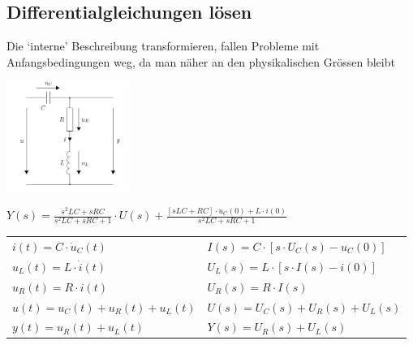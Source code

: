 \subsection{Differentialgleichungen lösen}
Die ‘interne’ Beschreibung transformieren, fallen Probleme mit Anfangsbedingungen weg, da man näher
an den physikalischen Grössen bleibt
\begin{multicols}{2}
		\begin{center}
			\includegraphics[width=4cm]{./images/diffgleichung.png}
		\end{center}
		$Y(s) = \frac{s^2 LC+sRC}{s^2 LC +sRC +1}\cdot U(s) + \frac{[sLC + RC] \cdot u_{C}(0) + L \cdot i(0)}{s^2 LC +sRC +1}$
	\columnbreak
\begin{center}
	\begin{tabular}{ll}
		$i(t) = C \cdot \dot{u}_{C}(t)$ & $I(s) = C  \cdot  [s  \cdot  U_{C}(s) - u_{C}(0)]$  \\
		$u_{L}(t) = L \cdot \dot{i}(t)$ & $U_{L}(s) = L  \cdot  [s  \cdot  I(s) - i(0)]$ \\
		$u_{R}(t) = R \cdot i(t)$ & $U_{R}(s) = R  \cdot  I(s)$ \\
		$u(t) = u_{C}(t) + u_{R}(t) + u_{L}(t)$ & $U(s) = U_{C}(s) + U_{R}(s) + U_{L}(s)$ \\
		$y(t) = u_{R}(t) + u_{L}(t)$ & $Y (s) = U_{R}(s) + U_{L}(s)$ \\
	\end{tabular}
\end{center}
\end{multicols}



